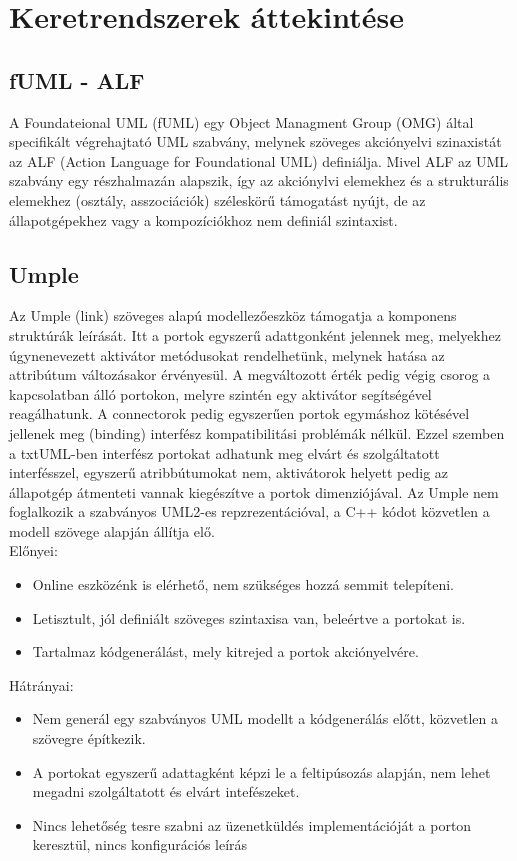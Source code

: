 \documentclass[a4paper,12pt]{report}
\begin{document}
\section{Keretrendszerek áttekintése}
\subsection{fUML - ALF}
A Foundateional UML (fUML) egy Object Managment Group (OMG) által specifikált végrehajtató UML szabvány, 
melynek szöveges akciónyelvi szinaxistát az ALF (Action Language for Foundational UML) definiálja.
Mivel ALF az UML szabvány egy részhalmazán alapszik, így az akciónylvi elemekhez és a strukturális elemekhez (osztály, asszociációk)  széleskörű támogatást nyújt, 
de az állapotgépekhez vagy a kompozíciókhoz nem definiál szintaxist.

\subsection{Umple}
Az Umple (link) szöveges alapú modellezőeszköz támogatja a komponens struktúrák leírását. Itt a portok egyszerű adattgonként jelennek meg, melyekhez úgynenevezett aktivátor metódusokat rendelhetünk, melynek hatása az attribútum változásakor érvényesül. A megváltozott érték pedig végig csorog a kapcsolatban álló portokon, melyre szintén egy aktivátor segítségével reagálhatunk. A connectorok pedig egyszerűen portok egymáshoz kötésével jellenek meg (binding) interfész kompatibilitási problémák nélkül. Ezzel szemben a txtUML-ben interfész portokat adhatunk meg elvárt és szolgáltatott interfésszel, egyszerű atribbútumokat nem, aktivátorok helyett pedig az állapotgép átmenteti vannak kiegészítve a portok dimenziójával. Az Umple nem foglalkozik a szabványos UML2-es repzrezentációval, a C++ kódot közvetlen a modell szövege alapján állítja elő. \\

Előnyei:
\begin{itemize}
\item Online eszközénk is elérhető, nem szükséges hozzá semmit telepíteni.
\item Letisztult, jól definiált szöveges szintaxisa van, beleértve a portokat is.
\item Tartalmaz kódgenerálást, mely kitrejed a portok akciónyelvére.
\end{itemize}
Hátrányai:
\begin{itemize}
\item Nem generál egy szabványos UML modellt a kódgenerálás előtt, közvetlen a szövegre építkezik.
\item A portokat egyszerű adattagként képzi le a feltipúsozás alapján, nem lehet megadni szolgáltatott és elvárt intefészeket.
\item Nincs lehetőség tesre szabni az üzenetküldés implementációját a porton keresztül, nincs konfigurációs leírás
\end{itemize}
\end{document}
